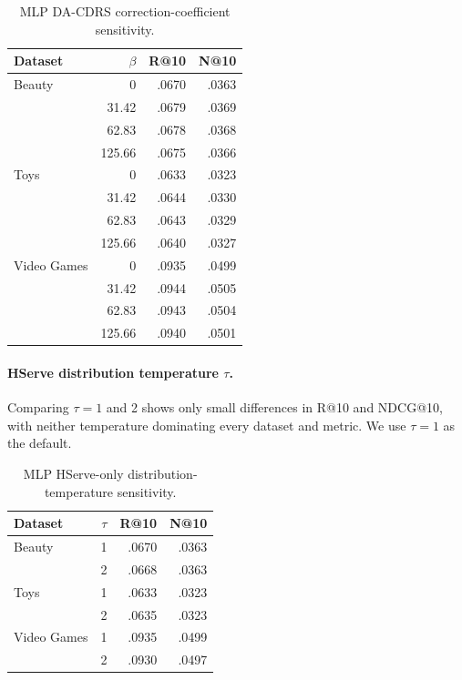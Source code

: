 \documentclass[sigconf, anonymous, review]{acmart}
\begin{document}
\begin{table}[t]
\centering
\caption{MLP DA-CDRS correction-coefficient sensitivity.}
\label{tab:sup-sensitive-beta}
\small
\setlength{\tabcolsep}{3.8pt}
\begin{tabular}{@{}lrrr@{}}
\toprule
Dataset & $\beta$ & R@10 & N@10 \\
\midrule
Beauty & 0 & .0670 & .0363 \\
 & 31.42 & .0679 & .0369 \\
 & 62.83 & .0678 & .0368 \\
 & 125.66 & .0675 & .0366 \\
\addlinespace[2pt]
Toys & 0 & .0633 & .0323 \\
 & 31.42 & .0644 & .0330 \\
 & 62.83 & .0643 & .0329 \\
 & 125.66 & .0640 & .0327 \\
\addlinespace[2pt]
Video Games & 0 & .0935 & .0499 \\
 & 31.42 & .0944 & .0505 \\
 & 62.83 & .0943 & .0504 \\
 & 125.66 & .0940 & .0501 \\
\bottomrule
\end{tabular}
\end{table}

\paragraph{HServe distribution temperature $\tau$.}
Comparing $\tau=1$ and 2 shows only small differences
in R@10 and NDCG@10, with neither temperature
dominating every dataset and metric. We use $\tau=1$
as the default.

\begin{table}[t]
\centering
\caption{MLP HServe-only distribution-temperature sensitivity.}
\label{tab:sup-sensitive-tau}
\small
\setlength{\tabcolsep}{3.8pt}
\begin{tabular}{@{}lrrr@{}}
\toprule
Dataset & $\tau$ & R@10 & N@10 \\
\midrule
Beauty & 1 & .0670 & .0363 \\
 & 2 & .0668 & .0363 \\
\addlinespace[2pt]
Toys & 1 & .0633 & .0323 \\
 & 2 & .0635 & .0323 \\
\addlinespace[2pt]
Video Games & 1 & .0935 & .0499 \\
 & 2 & .0930 & .0497 \\
\bottomrule
\end{tabular}
\end{table}
\end{document}
